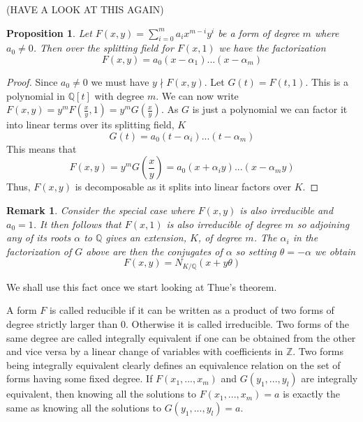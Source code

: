 \documentclass{article}
\newtheorem{proposition}{Proposition}[section]
\newtheorem{remark}{Remark}[section]
\newcommand{\mbb}[1]{\mathbb{#1}}
\begin{document}
(HAVE A LOOK AT THIS AGAIN)
\begin{proposition}\label{prop: Forms of two variables are decomposable}
    Let $F(x,y) = \sum_{i=0}^m a_i x^{m-i}y^{i}$ be a form of degree $m$ where $a_0 \neq 0$. Then over the splitting field for $F(x,1)$ we have the factorization
    $$F(x, y) = a_0(x - \alpha_1)...(x - \alpha_m)$$
\end{proposition}
\begin{proof}
    Since $a_0 \neq 0$ we must have $y \nmid F(x, y)$. Let $G(t) = F(t, 1)$. This is a polynomial in $\mbb Q[t]$ with degree $m$. We can now write
    $F(x, y) = y^mF(\frac{x}{y}, 1) = y^m G(\frac{x}{y})$. As $G$ is just a polynomial we can factor it into linear terms over its splitting field, $K$
    $$G(t) = a_0 (t - \alpha_i) ... (t - \alpha_m)$$
    This means that
    $$F(x,y) = y^mG(\frac{x}{y}) =  a_0 (x + \alpha_iy) ... (x - \alpha_m y)$$
    Thus, $F(x,y)$ is decomposable as it splits into linear factors over $K$.  
\end{proof}
\begin{remark}\label{remark: Forms of two variables are decomposable}
    Consider the special case where $F(x,y)$ is also irreducible and $a_0 = 1$. It then follows that $F(x,1)$ is also irreducible of degree $m$ so adjoining any of its roots $\alpha$ to $\mbb Q$ gives an extension, $K$, of degree $m$. The $\alpha_i$ in the factorization of $G$ above are then the conjugates of $\alpha$ so setting $\theta = -\alpha$ we obtain
    $$F(x,y) = N_{K / \mbb Q}(x + y \theta)$$
\end{remark}

We shall use this fact once we start looking at Thue's theorem. 

A form $F$ is called reducible if it can be written as a product of two forms of degree strictly larger than 0. Otherwise it is called irreducible. Two forms of the same degree are called integrally equivalent if one can be obtained from the other and vice versa by a linear change of variables with coefficients in $\mbb{Z}$. Two forms being integrally equivalent clearly defines an equivalence relation on the set of forms having some fixed degree. If $F(x_1, ..., x_m)$ and $G(y_1, ..., y_l)$ are integrally equivalent, then knowing all the solutions to $F(x_1, ..., x_m) = a$ is exactly the same as knowing all the solutions to $G(y_1, ..., y_l) = a$.  

\end{document}
